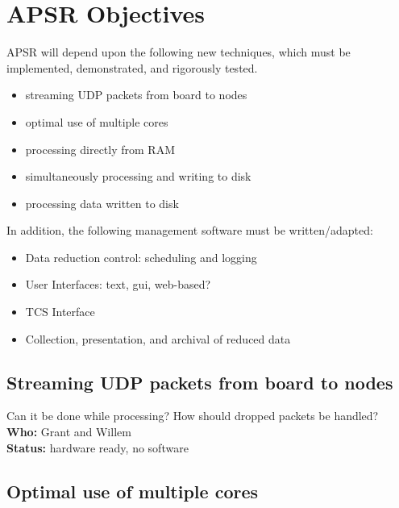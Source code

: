 \chapter{APSR Objectives}
\label{app:dada_todo}

APSR will depend upon the following new techniques, which must be
implemented, demonstrated, and rigorously tested.

\begin{itemize}

\item streaming UDP packets from board to nodes

\item optimal use of multiple cores

\item processing directly from RAM 

\item simultaneously processing and writing to disk

\item processing data written to disk \\

\end{itemize}

\noindent
In addition, the following management software must be written/adapted:

\begin{itemize}

\item Data reduction control: scheduling and logging

\item User Interfaces: text, gui, web-based?

\item TCS Interface

\item Collection, presentation, and archival of reduced data

\end{itemize}
\section{Streaming UDP packets from board to nodes}

Can it be done while processing? How should dropped packets be handled? \\
{\bf Who:} Grant and Willem \\
{\bf Status:} hardware ready, no software

\section{Optimal use of multiple cores}

